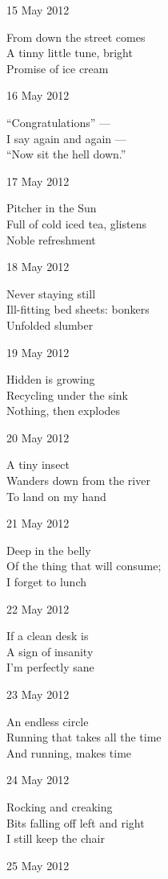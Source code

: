 \documentclass[12pt]{article}
\begin{document}
15 May 2012

From down the street comes \\
A tinny little tune, bright \\
Promise of ice cream

16 May 2012

``Congratulations'' --- \\
I say again and again --- \\
``Now sit the hell down.''

17 May 2012

Pitcher in the Sun \\
Full of cold iced tea, glistens \\
Noble refreshment


\newpage

18 May 2012

Never staying still \\
Ill-fitting bed sheets: bonkers \\
Unfolded slumber

19 May 2012

Hidden is growing \\
Recycling under the sink \\
Nothing, then explodes

20 May 2012

A tiny insect \\
Wanders down from the river \\
To land on my hand

21 May 2012

Deep in the belly \\
Of the thing that will consume; \\
I forget to lunch

22 May 2012

If a clean desk is \\
A sign of insanity \\
I'm perfectly sane

23 May 2012

An endless circle \\
Running that takes all the time \\
And running, makes time

24 May 2012

Rocking and creaking \\
Bits falling off left and right \\
I still keep the chair


\newpage

25 May 2012
\end{document}
